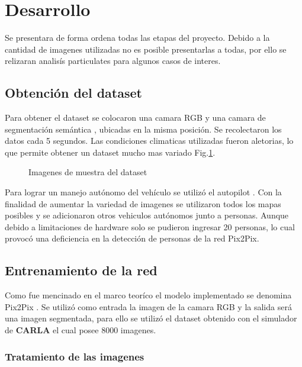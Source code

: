 \documentclass[]{IEEEtran}
\begin{document}
    \section{Desarrollo}

    Se presentara de forma ordena todas las etapas del proyecto. 
    Debido a la cantidad de imagenes utilizadas no es posible presentarlas a todas, por ello 
    se relizaran analisís particulates para algunos casos de interes.

    \subsection{Obtención del dataset}

    Para obtener el dataset se colocaron una camara RGB y una camara de segmentación semántica
    \cite{CARLA-Sensors-Reference}, ubicadas en la misma posición. Se recolectaron los datos 
    cada 5 segundos. Las condiciones climaticas utilizadas fueron aletorias, lo que permite 
    obtener un dataset mucho mas variado Fig.\ref{fig:dataset}.

    \begin{figure}
        \centering
        \caption{Imagenes de muestra del dataset}
        \label{fig:dataset}
    \end{figure}

    Para lograr un manejo autónomo del vehículo se utilizó el autopilot \cite{CARLA-Documentation}. 
    Con la finalidad de aumentar la variedad de imagenes se utilizaron todos los mapas posibles y 
    se adicionaron otros vehiculos autónomos junto a personas. Aunque debido 
    a limitaciones de hardware solo se pudieron ingresar 20 personas, lo cual 
    provocó una deficiencia en la detección de personas de la red Pix2Pix. 

    \subsection{Entrenamiento de la red}

    Como fue mencinado en el marco teoríco el modelo implementado se denomina Pix2Pix \cite{Pix2Pix}.
    Se utilizó como entrada la imagen de la camara RGB y la salida será una imagen segmentada, para ello se utilizó
    el dataset obtenido con el simulador de \textbf{CARLA} el cual posee 8000 imagenes. 

    \subsubsection{Tratamiento de las imagenes}
\end{document}
